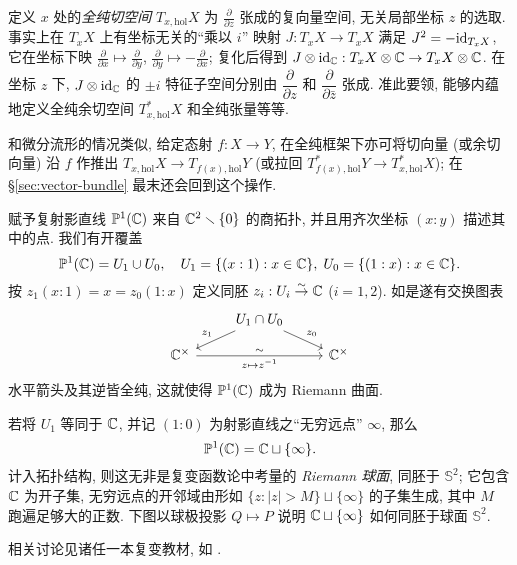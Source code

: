 定义 $x$ 处的\emph{全纯切空间} $T_{x, \text{hol}} X$ 为 $\frac{\partial}{\partial z}$ 张成的复向量空间, 无关局部坐标 $z$ 的选取. 事实上在 $T_x X$ 上有坐标无关的``乘以 $i$'' 映射 $J: T_x X \to T_x X$ 满足 $J^2 = -\mathrm{id}_{T_x X}$, 它在坐标下映 $\frac{\partial}{\partial x} \mapsto \frac{\partial}{\partial y}$, $\frac{\partial}{\partial y} \mapsto -\frac{\partial}{\partial x}$; 复化后得到 $J \otimes \mathrm{id}_{\mathbb{C}}: T_x X \otimes \mathbb{C} \to T_x X \otimes \mathbb{C}$. 在坐标 $z$ 下, $J \otimes \mathrm{id}_{\mathbb{C}}$ 的 $\pm i$ 特征子空间分别由 $\dfrac{\partial}{\partial z}$ 和 $\dfrac{\partial}{\partial \bar{z}}$ 张成. 准此要领, 能够内蕴地定义全纯余切空间 $T^*_{x, \text{hol}} X$ 和全纯张量等等.

和微分流形的情况类似, 给定态射 $f: X \to Y$, 在全纯框架下亦可将切向量 (或余切向量) 沿 $f$ 作推出 $T_{x, \text{hol}} X \to T_{f(x), \text{hol}} Y$ (或拉回 $T^*_{f(x), \text{hol}} Y \to T^*_{x, \text{hol}} X$); 在 \S\ref{sec:vector-bundle} 最末还会回到这个操作.

\begin{example}[复射影直线]\label{eg:P1-cplx}
	赋予复射影直线 $\mathbb{P}^1(\mathbb{C})$ 来自 $\mathbb{C}^2 \smallsetminus \{0\}$ 的商拓扑, 并且用齐次坐标 $(x:y)$ 描述其中的点. 我们有开覆盖
	\[ \mathbb{P}^1(\mathbb{C}) = U_1 \cup U_0, \quad U_1 = \{(x:1) : x \in \mathbb{C} \}, \; U_0 = \{(1:x) : x \in \mathbb{C} \}. \]
	按 $z_1(x:1) = x = z_0(1:x)$ 定义同胚 $z_i: U_i \stackrel{\sim}{\rightarrow} \mathbb{C}$ ($i=1,2$). 如是遂有交换图表
	\[\begin{tikzcd}[row sep=small]
		& U_1 \cap U_0 \arrow[ld, "z_1"'] \arrow[rd, "z_0"] \\
		\CC^\times \arrow[rr, "z \mapsto z^{-1}"', "\sim"] & & \CC^\times
	\end{tikzcd}\]
	水平箭头及其逆皆全纯, 这就使得 $\mathbb{P}^1(\mathbb{C})$ 成为 Riemann 曲面.
\end{example}

若将 $U_1$ 等同于 $\mathbb{C}$, 并记 $(1:0)$ 为射影直线之``无穷远点'' $\infty$, 那么
\[ \mathbb{P}^1(\mathbb{C}) = \mathbb{C} \sqcup \{ \infty \}. \]
计入拓扑结构, 则这无非是复变函数论中考量的 \emph{Riemann 球面}, 同胚于 $\mathbb{S}^2$; 它包含 $\mathbb{C}$ 为开子集, 无穷远点的开邻域由形如 $\{z: |z| > M \} \sqcup \{\infty\}$ 的子集生成, 其中 $M$ 跑遍足够大的正数. 下图以球极投影 $Q \mapsto P$ 说明 $\mathbb{C} \sqcup \{\infty\}$ 如何同胚于球面 $\mathbb{S}^2$.
\begin{center}\end{center}
相关讨论见诸任一本复变教材, 如 \cite[\S 1.4]{TW06}.

